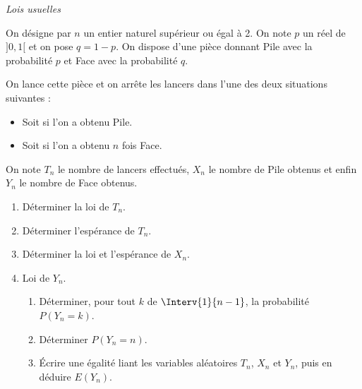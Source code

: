 \documentclass[a4paper,10pt]{report}
\begin{document}
\medskip

\begin{center}
\textit{{ {\large Lois usuelles}}}
\end{center}

\medskip

\begin{Exercice}{} On désigne par $n$ un entier naturel supérieur ou égal à 2. On note $p$ un réel de $]0,1[$ et on pose $q = 1-p$. On dispose d'une pièce donnant Pile avec la probabilité $p$ et Face avec la probabilité $q$.

\noindent On lance cette pièce et on arrête les lancers dans l'une des deux situations suivantes :
\begin{itemize}
 \item Soit si l'on a obtenu Pile.
 \item Soit si l'on a obtenu $n$ fois Face.
\end{itemize}
%

\noindent On note $T_n$ le nombre de lancers effectués, $X_n$ le nombre de Pile obtenus et enfin $Y_n$ le nombre de Face obtenus. 
\begin{enumerate}
 \item  Déterminer la loi de $T_n$.
 \item  Déterminer l'espérance de $T_n$.
 \item Déterminer la loi et l'espérance de $X_n$.
 \item Loi de $Y_n$.
 \begin{enumerate}
  \item Déterminer, pour tout $k$ de $\Interv{1}{n-1}$, la probabilité $P(Y_n = k)$.
  \item Déterminer $P(Y_n = n)$.
  \item Écrire une égalité liant les variables aléatoires $T_n$, $X_n$ et $Y_n$, puis en déduire $E(Y_n)$.
\end{enumerate}
\end{enumerate}
\end{Exercice}
\end{document}
